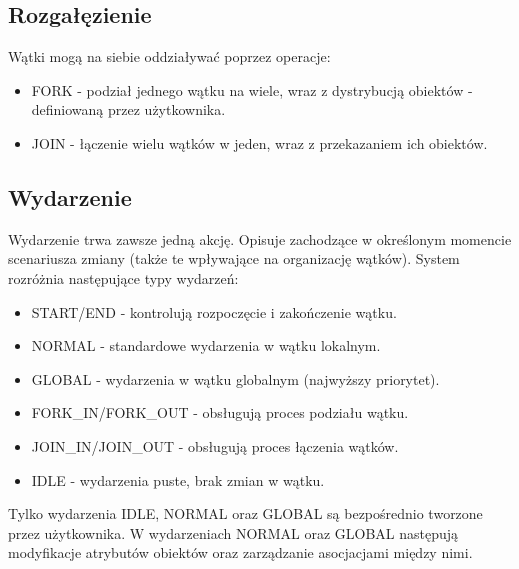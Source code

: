 \subsection{Rozgałęzienie}

Wątki mogą na siebie oddziaływać poprzez operacje:
\begin{itemize}
    \item FORK - podział jednego wątku na wiele, wraz z dystrybucją obiektów - definiowaną przez użytkownika.
    \item JOIN - łączenie wielu wątków w jeden, wraz z przekazaniem ich obiektów.
\end{itemize}

\subsection{Wydarzenie}

Wydarzenie trwa zawsze jedną akcję. Opisuje zachodzące w określonym momencie scenariusza zmiany (także te wpływające na organizację 
wątków). System rozróżnia następujące typy wydarzeń:
\begin{itemize}
    \item START/END - kontrolują rozpoczęcie i zakończenie wątku.
    \item NORMAL - standardowe wydarzenia w wątku lokalnym.
    \item GLOBAL - wydarzenia w wątku globalnym (najwyższy priorytet).
    \item FORK\_IN/FORK\_OUT - obsługują proces podziału wątku.
    \item JOIN\_IN/JOIN\_OUT - obsługują proces łączenia wątków.
    \item IDLE - wydarzenia puste, brak zmian w wątku.
\end{itemize}

Tylko wydarzenia IDLE, NORMAL oraz GLOBAL są bezpośrednio tworzone przez użytkownika. 
W wydarzeniach NORMAL oraz GLOBAL następują modyfikacje atrybutów obiektów oraz zarządzanie asocjacjami między nimi.

\newpage
